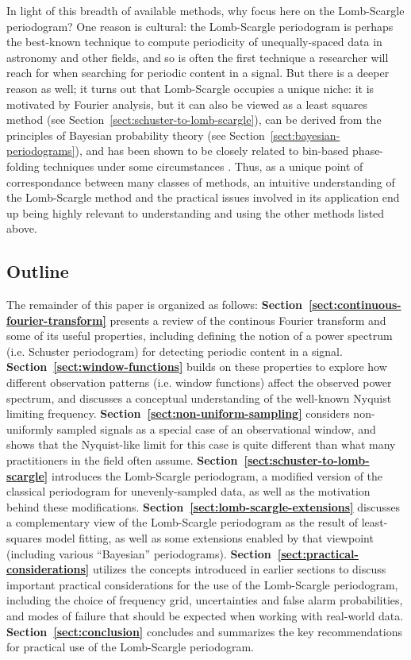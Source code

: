 \documentclass[preprint]{aastex}
\newcommand{\Sect}[1]{Section~\ref{sect:#1}}
\newcommand{\sect}[1]{\Sect{#1}}
\begin{document}
In light of this breadth of available methods, why focus here on the
Lomb-Scargle periodogram?
One reason is cultural: the Lomb-Scargle periodogram is perhaps the best-known
technique to compute periodicity of unequally-spaced data in astronomy and
other fields, and so is often the first technique a researcher will reach for
when searching for periodic content in a signal.
But there is a deeper reason as well;
it turns out that Lomb-Scargle occupies a unique niche:
it is motivated by Fourier analysis,
but it can also be viewed as a least squares method
(see \sect{schuster-to-lomb-scargle}), can be derived from the principles
of Bayesian probability theory (see \sect{bayesian-periodograms}), and has
been shown to be closely related to bin-based phase-folding techniques under
some circumstances \citep[see][]{Swingler89}.
Thus, as a unique point of correspondance between many classes of methods,
an intuitive understanding of the Lomb-Scargle method and the practical
issues involved in its application end up being highly relevant to
understanding and using the other methods listed above.

\subsection{Outline}
The remainder of this paper is organized as follows:
{\bf\sect{continuous-fourier-transform}} presents a review of the 
continous Fourier transform and some of its useful properties,
including defining the notion of a power spectrum (i.e. Schuster
periodogram) for detecting periodic content in a signal.
{\bf\sect{window-functions}} builds on these properties to explore how
different observation patterns (i.e. window functions) affect the observed
power spectrum, and discusses a conceptual understanding of the
well-known Nyquist limiting frequency.
{\bf\sect{non-uniform-sampling}} considers non-uniformly sampled signals as
a special case of an observational window, and shows that the Nyquist-like
limit for this case is quite different than what many practitioners in 
the field often assume.
{\bf\sect{schuster-to-lomb-scargle}} introduces the Lomb-Scargle periodogram,
a modified version of the classical periodogram for unevenly-sampled data,
as well as the motivation behind these modifications.
{\bf\sect{lomb-scargle-extensions}} discusses a complementary view of the
Lomb-Scargle periodogram as the result of least-squares model fitting,
as well as some extensions enabled by that viewpoint
(including various ``Bayesian'' periodograms).
{\bf\sect{practical-considerations}} utilizes the concepts introduced
in earlier sections to discuss important practical considerations for
the use of the Lomb-Scargle periodogram, including the choice of
frequency grid, uncertainties and false alarm probabilities, and modes of
failure that should be expected when working with real-world data.
{\bf\sect{conclusion}} concludes and summarizes the key recommendations
for practical use of the Lomb-Scargle periodogram.
\end{document}
